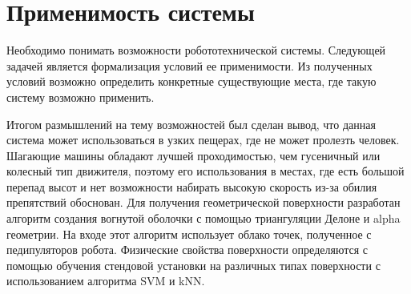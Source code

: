 \section{Применимость системы}
Необходимо понимать возможности робототехнической системы. Следующей задачей является формализация условий ее применимости. Из полученных условий возможно определить конкретные существующие места, где такую систему возможно применить.

Итогом размышлений на тему возможностей был сделан вывод, что данная система может использоваться в узких пещерах, где не может пролезть человек. Шагающие машины обладают лучшей проходимостью, чем гусеничный или колесный тип движителя, поэтому его использования в местах, где есть большой перепад высот и нет возможности набирать высокую скорость из-за обилия препятствий обоснован. Для получения геометрической поверхности разработан алгоритм создания вогнутой оболочки с помощью триангуляции Делоне и alpha геометрии. На входе этот алгоритм использует облако точек, полученное с педипуляторов робота. Физические свойства поверхности определяются с помощью обучения стендовой установки на различных типах поверхности с использованием алгоритма SVM и kNN.